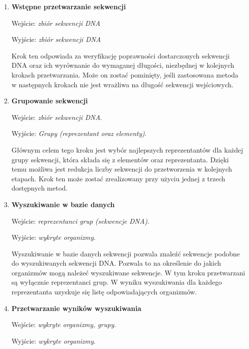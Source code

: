            \begin{enumerate}
                \item {
                    \textbf{Wstępne przetwarzanie sekwencji}

                    Wejście: \textit{zbiór sekwencji DNA}

                    Wyjście: \textit{zbiór sekwencji DNA}

                    Krok ten odpowiada za weryfikację poprawności dostarczonych sekwencji DNA oraz ich wyrównanie do wymaganej długości, niezbędnej w kolejnych krokach przetwarzania. Może on zostać pominięty, jeśli zastosowana metoda w następnych krokach nie jest wrażliwa na długość sekwencji wejściowych.
                }
                \item {
                    \textbf{Grupowanie sekwencji}

                    Wejście: \textit{zbiór sekwencji DNA}.

                    Wyjście: \textit{Grupy (reprezentant oraz elementy)}.

                    Głównym celem tego kroku jest wybór najlepszych reprezentantów dla każdej grupy sekwencji, która składa się z elementów oraz reprezentanta. Dzięki temu możliwa jest redukcja liczby sekwencji do przetworzenia w kolejnych etapach. Krok ten może zostać zrealizowany przy użyciu jednej z trzech dostępnych metod.
                }
                \item {
                    \textbf{Wyszukiwanie w bazie danych}

                    Wejście: \textit{reprezentanci grup (sekwencje DNA)}.

                    Wyjście: \textit{wykryte organizmy}.

                    Wyszukiwanie w bazie danych sekwencji pozwala znaleźć sekwencje podobne do wyszukiwanych sekwencji DNA. Pozwala to na określenie do jakich organizmów mogą należeć wyszukiwane sekwencje. W tym kroku przetwarzani są wyłącznie reprezentanci grup. W wyniku wyszukiwania dla każdego reprezentanta uzyskuje się listę odpowiadających organizmów.
                }
                \item {
                    \textbf{Przetwarzanie wyników wyszukiwania}

                    Wejście: \textit{wykryte organizmy, grupy}.

                    Wyjście: \textit{wykryte organizmy}.

}
\end{enumerate}
